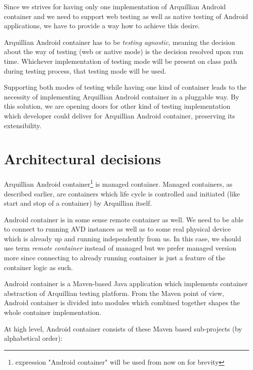 \documentclass[12pt,final,oneside]{fithesis}
\begin{document}
Since we strives for having only one implementation of Arquillian Android container and we need to support web testing as well as native testing of Android applications, we have to provide a way how to achieve this desire. 

Arquillian Android container has to be \textit{testing agnostic}, meaning the decision about the way of testing (web or native mode) is the decision resolved upon run time. Whichever implementation of testing mode will be present on class path during testing process, that testing mode will be used.

Supporting both modes of testing while having one kind of container leads to the necessity of implementing Arquillian Android container in a pluggable way. By this solution, we are opening doors for other kind of testing implementation which developer could deliver for Arquillian Android container, preserving its extensibility.

	\section{Architectural decisions}

Arquillian Android container\footnote{expression "Android container" will be used from now on for brevity} is managed container. Managed containers, as described earlier, are containers which life cycle is controlled and initiated (like start and stop of a container) by Arquillian itself.

Android container is in some sense remote container as well. We need to be able to connect to running AVD instances as well as to some real physical device which is already up and running independently from us. In this case, we should use term \textit{remote container} instead of managed but we prefer managed version more since connecting to already running container is just a feature of the container logic as such.

Android container is a Maven-based Java application which implements container abstraction of Arquillian testing platform. From the Maven point of view, Android container is divided into modules which combined together shapes the whole container implementation.

At high level, Android container consists of these Maven based sub-projects (by alphabetical order):
\end{document}
